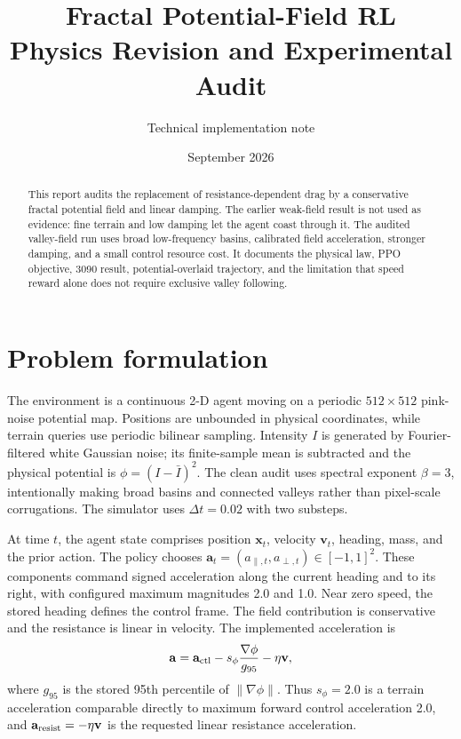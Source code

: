 \documentclass[10pt]{article}
\title{\vspace{-1.2em}\textbf{Fractal Potential-Field RL}\\
\large Physics Revision and Experimental Audit}
\author{Technical implementation note}
\date{September 2026}
\begin{document}
\maketitle
\vspace{-1.2em}
\begin{abstract}
This report audits the replacement of resistance-dependent drag by a conservative
fractal potential field and linear damping. The earlier weak-field result is not
used as evidence: fine terrain and low damping let the agent coast through it.
The audited valley-field run uses broad low-frequency basins, calibrated field
acceleration, stronger damping, and a small control resource cost. It documents
the physical law, PPO objective, 3090 result, potential-overlaid trajectory, and
the limitation that speed reward alone does not require exclusive valley following.
\end{abstract}

\section{Problem formulation}
The environment is a continuous 2-D agent moving on a periodic $512\times512$
pink-noise potential map. Positions are unbounded in physical coordinates, while
terrain queries use periodic bilinear sampling. Intensity $I$ is generated by
Fourier-filtered white Gaussian noise; its finite-sample mean is subtracted and
the physical potential is $\phi=(I-\bar I)^2$. The clean
audit uses spectral exponent $\beta=3$, intentionally making broad basins and
connected valleys rather than pixel-scale corrugations. The simulator uses
$\Delta t=0.02$ with two substeps.

At time $t$, the agent state comprises position $\mathbf{x}_t$, velocity
$\mathbf{v}_t$, heading, mass, and the prior action. The policy chooses
$\mathbf{a}_t=(a_{\parallel,t},a_{\perp,t})\in[-1,1]^2$. These components command
signed acceleration along the current heading and to its right, with configured
maximum magnitudes 2.0 and 1.0. Near zero speed, the stored heading defines the
control frame. The field contribution is conservative and the resistance is
linear in velocity. The implemented acceleration is
\begin{equation}
 \mathbf a=\mathbf a_{\rm ctl}-s_\phi\frac{\nabla\phi}{g_{95}}-\eta\mathbf v,
\end{equation}
where $g_{95}$ is the stored 95th percentile of $\|\nabla\phi\|$. Thus
$s_\phi=2.0$ is a terrain acceleration comparable directly to maximum forward
control acceleration 2.0, and $\mathbf a_{\rm resist}=-\eta\mathbf v$ is the
requested linear resistance acceleration.
\end{document}
